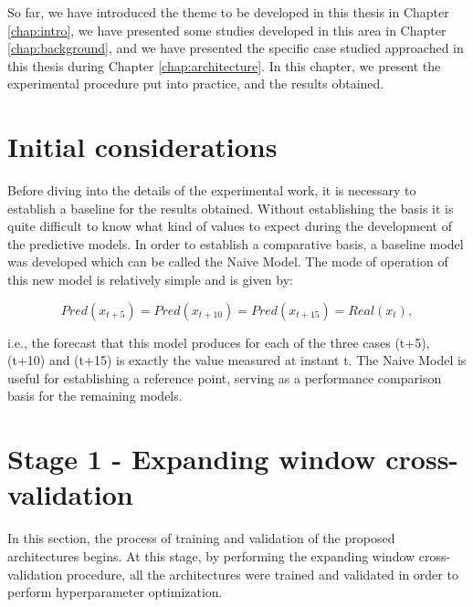\cleardoublepage
\label{chap:results}

So far, we have introduced the theme to be developed in this thesis in Chapter \ref{chap:intro}, we have presented some studies developed in this area in Chapter \ref{chap:background}, and we have presented the specific case studied approached in this thesis during Chapter \ref{chap:architecture}. In this chapter, we present the experimental procedure put into practice, and the results obtained.



\section{Initial considerations}

Before diving into the details of the experimental work, it is necessary to establish a baseline for the results obtained. Without establishing the basis it is quite difficult to know what kind of values to expect during the development of the predictive models. In order to establish a comparative basis, a baseline model was developed which can be called the Naive Model. The mode of operation of this new model is relatively simple and is given by:

\begin{equation}
   Pred(x_{t+5}) = Pred(x_{t+10}) = Pred(x_{t+15}) = Real(x_{t}),
   \label{naive}
\end{equation}

i.e., the forecast that this model produces for each of the three cases (t+5), (t+10) and (t+15) is exactly the value measured at instant t. The Naive Model is useful for establishing a reference point, serving as a performance comparison basis for the remaining models.

\section{Stage 1 - Expanding window cross-validation}\label{chap3:section:stage_1}

In this section, the process of training and validation of the proposed architectures begins. At this stage, by performing the expanding window cross-validation procedure, all the architectures were trained and validated in order to perform hyperparameter optimization. 

